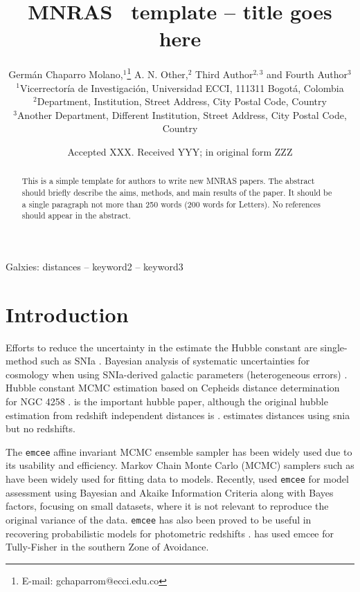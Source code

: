 \documentclass[a4paper,fleqn,usenatbib]{mnras}
\title[Short title, max. 45 characters]{MNRAS \LaTeXe\ template -- title goes here}
\author[G. Chaparro Molano et al.]{
Germ\'an Chaparro Molano,$^{1}$\thanks{E-mail: gchaparrom@ecci.edu.co}
A. N. Other,$^{2}$
Third Author$^{2,3}$
and Fourth Author$^{3}$
\\
$^{1}$Vicerrector\'ia de Investigaci\'on, Universidad ECCI, 111311 Bogot\'a, Colombia\\
$^{2}$Department, Institution, Street Address, City Postal Code, Country\\
$^{3}$Another Department, Different Institution, Street Address, City Postal Code, Country
}
\date{Accepted XXX. Received YYY; in original form ZZZ}
\begin{document}
\label{firstpage}
\pagerange{\pageref{firstpage}--\pageref{lastpage}}
\maketitle

\begin{abstract}
This is a simple template for authors to write new MNRAS papers.
The abstract should briefly describe the aims, methods, and main results of the paper.
It should be a single paragraph not more than 250 words (200 words for Letters).
No references should appear in the abstract.
\end{abstract}

\begin{keywords}
Galxies: distances -- keyword2 -- keyword3
\end{keywords}



\section{Introduction}

Efforts to reduce the uncertainty in the estimate the Hubble constant are single-method such as SNIa \citet{hubsn2018}. Bayesian analysis of systematic uncertainties for cosmology when using SNIa-derived galactic parameters (heterogeneous errors) \citet{unity}. Hubble constant MCMC estimation based on Cepheids distance determination for NGC 4258 \citet{hubngc}. \citet{hub2010} is the important hubble paper, although the original hubble estimation from redshift independent distances is \citet{huborig}. \citet{ridsn} estimates distances using snia but no redshifts. 

The \texttt{emcee} affine invariant MCMC ensemble sampler \citet{emcee} has been widely used due to its usability and efficiency. Markov Chain Monte Carlo (MCMC) samplers such as \citet{emcee} have been widely used for fitting data to models. Recently, \citet{propprob2018} used \texttt{emcee} for model assessment using Bayesian and Akaike Information Criteria along with Bayes factors, focusing on small datasets, where it is not relevant to reproduce the original variance of the data. \texttt{emcee} has also been proved to be useful in recovering probabilistic models for photometric redshifts \citet{photred1,photred2} . \citet{said} has used emcee for Tully-Fisher in the southern Zone of Avoidance.
\end{document}
